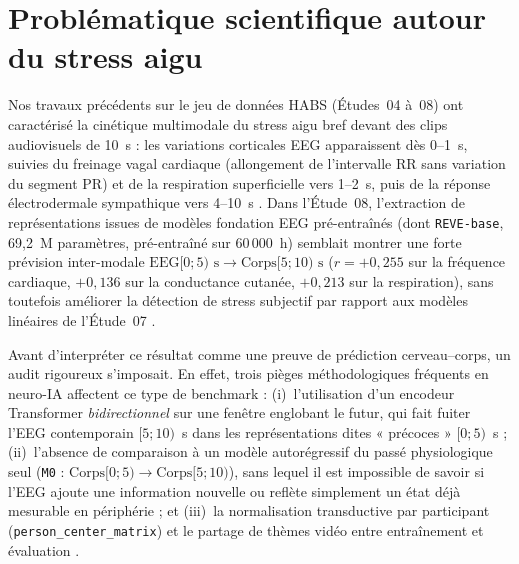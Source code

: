\documentclass[10pt]{article}
\begin{document}
\begin{abstract}
confirme une couverture de 96,5\,\% et une corrélation binoculaire de $0{,}852$ avec un décrochage de vitesse du regard à $t = 0{,}00$~s ($+121$~px/s), mais échoue à la porte pupillaire moyenne stricte et reste au hasard en détection de stress ($0{,}5058$) ; enfin, le stacking OOF imbriqué échoue sur toutes les tâches (abstention EDA ; stress $-0{,}0084$, ECG $-0{,}0011$, respiration $-0{,}0057$). Ces résultats établissent une prédiction temporelle incrémentale cerveau--cœur fine et robuste sans revendiquer de causalité mécanistique ni de plafond physiologique.
\end{abstract}

\section{Problématique scientifique autour du stress aigu}

Nos travaux précédents sur le jeu de données HABS (Études~04 à~08) ont caractérisé la cinétique multimodale du stress aigu bref devant des clips audiovisuels de 10~s : les variations corticales EEG apparaissent dès 0--1~s, suivies du freinage vagal cardiaque (allongement de l'intervalle RR sans variation du segment PR) et de la respiration superficielle vers 1--2~s, puis de la réponse électrodermale sympathique vers 4--10~s \cite{palomba2000,hagenaars2014,benedek2010}. Dans l'Étude~08, l'extraction de représentations issues de modèles fondation EEG pré-entraînés (dont \texttt{REVE-base}, 69,2~M paramètres, pré-entraîné sur 60\,000~h) semblait montrer une forte prévision inter-modale $\text{EEG}[0 ; 5)\text{~s} \to \text{Corps}[5 ; 10)\text{~s}$ ($r = +0{,}255$ sur la fréquence cardiaque, $+0{,}136$ sur la conductance cutanée, $+0{,}213$ sur la respiration), sans toutefois améliorer la détection de stress subjectif par rapport aux modèles linéaires de l'Étude~07 \cite{varoquaux2018}.

Avant d'interpréter ce résultat comme une preuve de prédiction cerveau--corps, un audit rigoureux s'imposait. En effet, trois pièges méthodologiques fréquents en neuro-IA affectent ce type de benchmark : (i)~l'utilisation d'un encodeur Transformer \emph{bidirectionnel} sur une fenêtre englobant le futur, qui fait fuiter l'EEG contemporain $[5 ; 10)$~s dans les représentations dites « précoces » $[0 ; 5)$~s ; (ii)~l'absence de comparaison à un modèle autorégressif du passé physiologique seul (\texttt{M0} : $\text{Corps}[0 ; 5) \to \text{Corps}[5 ; 10)$), sans lequel il est impossible de savoir si l'EEG ajoute une information nouvelle ou reflète simplement un état déjà mesurable en périphérie ; et (iii)~la normalisation transductive par participant (\texttt{person\_center\_matrix}) et le partage de thèmes vidéo entre entraînement et évaluation \cite{giannakakis2015,gerster2026}.
\end{document}
